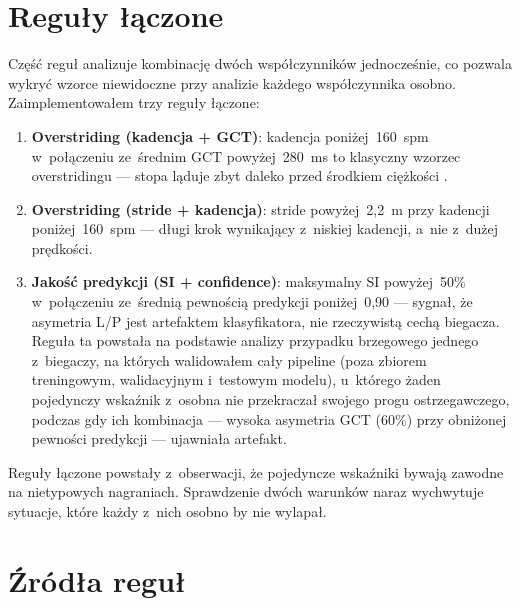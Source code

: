 \section{Reguły łączone}
\label{sec:rules-combined}

Część reguł analizuje kombinację dwóch współczynników jednocześnie, co pozwala wykryć wzorce niewidoczne przy analizie każdego współczynnika osobno. Zaimplementowałem trzy reguły łączone:

\begin{enumerate}
    \item \textbf{Overstriding (kadencja + GCT)}: kadencja poniżej~160~spm w~połączeniu ze~średnim GCT powyżej~280~ms to klasyczny wzorzec overstridingu --- stopa ląduje zbyt daleko przed środkiem ciężkości \cite{heiderscheit2011}.
    \item \textbf{Overstriding (stride + kadencja)}: stride powyżej~2{,}2~m przy kadencji poniżej~160~spm --- długi krok wynikający z~niskiej kadencji, a~nie z~dużej prędkości.
    \item \textbf{Jakość predykcji (SI + confidence)}: maksymalny SI powyżej~50\% w~połączeniu ze~średnią pewnością predykcji poniżej~0{,}90 --- sygnał, że asymetria L/P jest artefaktem klasyfikatora, nie rzeczywistą cechą biegacza. Reguła ta powstała na podstawie analizy przypadku brzegowego jednego z~biegaczy, na których walidowałem cały pipeline (poza zbiorem treningowym, walidacyjnym i~testowym modelu), u~którego żaden pojedynczy wskaźnik z~osobna nie przekraczał swojego progu ostrzegawczego, podczas gdy ich kombinacja --- wysoka asymetria GCT (60\%) przy obniżonej pewności predykcji --- ujawniała artefakt.
\end{enumerate}

Reguły łączone powstały z~obserwacji, że pojedyncze wskaźniki bywają zawodne na nietypowych nagraniach. Sprawdzenie dwóch warunków naraz wychwytuje sytuacje, które każdy z~nich osobno by nie wylapał.

\section{Źródła reguł}
\label{sec:rules-sources}

